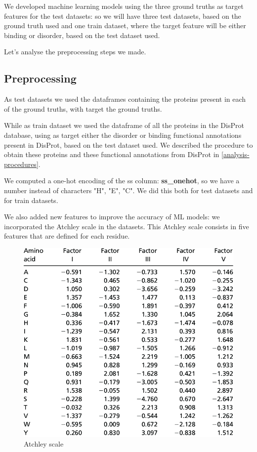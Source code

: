 We developed machine learning models using the three ground truths as target features for the test datasets: so we will have three test datasets, based on the ground truth used and one train dataset, where the target feature will be either binding or disorder, based on the test dataset used.

Let's analyse the preprocessing steps we made.

\subsection{Preprocessing}
As test datasets we used the dataframes containing the proteins present in each of the ground truths, with target the ground truths.

While as train dataset we used the dataframe of all the proteins in the DisProt database, using as target either the disorder or binding functional annotations present in DisProt, based on the test dataset used. We described the procedure to obtain these proteins and these functional annotations from DisProt in \ref{analysis-procedures}.

We computed a one-hot encoding of the ss column: \textbf{ss\_onehot}, so we have a number instead of characters "H", "E", "C". We did this both for test datasets and for train datasets. 

We also added new features to improve the accuracy of ML models: we incorporated the Atchley scale in the datasets. This Atchley scale consists in five features that are defined for each residue.

\begin{figure}
    \centering
    \includegraphics[scale=0.4]{res/ML/atchley.png}
    \caption{Atchley scale}
\end{figure}

